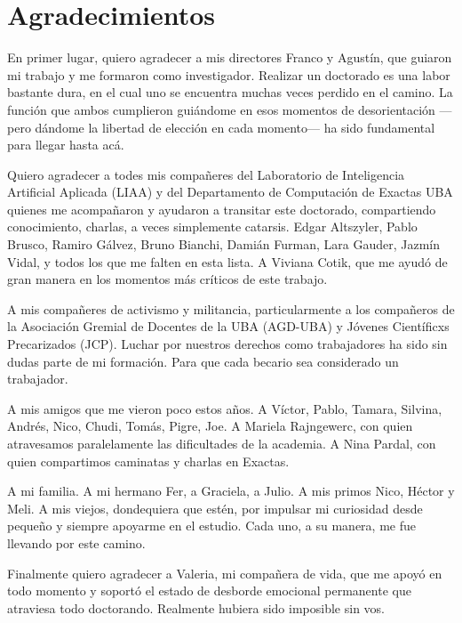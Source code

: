 \chapter*{Agradecimientos}


En primer lugar, quiero agradecer a mis directores Franco y Agustín, que guiaron mi trabajo y me formaron como investigador. Realizar un doctorado es una labor bastante dura, en el cual uno se encuentra muchas veces perdido en el camino. La función que ambos cumplieron guiándome en esos momentos de desorientación ---pero dándome la libertad de elección en cada momento--- ha sido fundamental para llegar hasta acá.

Quiero agradecer a todes mis compañeres del Laboratorio de Inteligencia Artificial Aplicada (LIAA) y del Departamento de Computación de Exactas UBA quienes me acompañaron y ayudaron a transitar este doctorado, compartiendo conocimiento, charlas, a veces simplemente catarsis. Edgar Altszyler, Pablo Brusco, Ramiro Gálvez, Bruno Bianchi, Damián Furman, Lara Gauder, Jazmín Vidal, y todos los que me falten en esta lista. A Viviana Cotik, que me ayudó de gran manera en los momentos más críticos de este trabajo.

A mis compañeres de activismo y militancia, particularmente a los compañeros de la Asociación Gremial de Docentes de la UBA (AGD-UBA) y Jóvenes Científicxs Precarizados (JCP). Luchar por nuestros derechos como trabajadores ha sido sin dudas parte de mi formación. Para que cada becario sea considerado un trabajador.

A mis amigos que me vieron poco estos años. A Víctor, Pablo, Tamara, Silvina, Andrés, Nico, Chudi, Tomás, Pigre, Joe. A Mariela Rajngewerc, con quien atravesamos paralelamente las dificultades de la academia. A Nina Pardal, con quien compartimos caminatas y charlas en Exactas.

A mi familia. A mi hermano Fer, a Graciela, a Julio. A mis primos Nico, Héctor y Meli. A mis viejos, dondequiera que estén, por impulsar mi curiosidad desde pequeño y siempre apoyarme en el estudio. Cada uno, a su manera, me fue llevando por este camino.

Finalmente quiero agradecer a Valeria, mi compañera de vida, que me apoyó en todo momento y soportó el estado de desborde emocional permanente que atraviesa todo doctorando. Realmente hubiera sido imposible sin vos.

